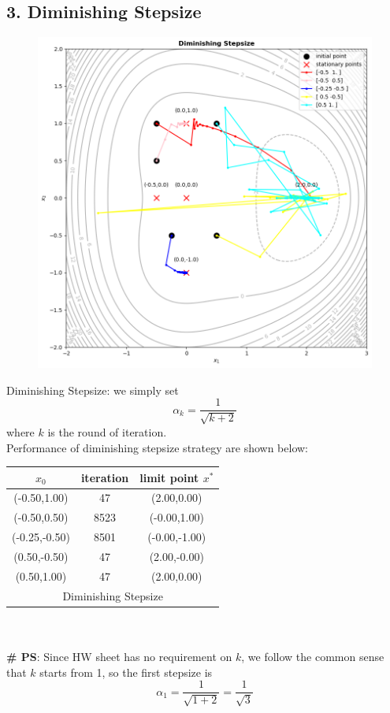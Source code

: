 \documentclass{article}
\newcommand{\subs}[1]{\subsection*{#1}}
\begin{document}
\endgroup
\vspace{1cm}

\subs{3. Diminishing Stepsize}

\begingroup
\setlength{\intextsep}{0pt}%
\setlength{\columnsep}{0pt}%
\begin{figure}%
  \centering
  \includegraphics[width=\linewidth]{Diminishing Stepsize.png}
\end{figure}

\noindent Diminishing Stepsize: we simply set
\[
  \alpha_k = \frac{1}{\sqrt{k+2}}
\]
where $k$ is the round of iteration.\\
Performance of diminishing stepsize strategy are shown below:

\noindent\begin{tabular}{ccc}
    
  \hline
  $x_0$ & iteration & limit point $x^*$\\
  \hline
  (-0.50,1.00) & 47 & (2.00,0.00)  \\ %
  (-0.50,0.50) & 8523 & (-0.00,1.00) \\ %
  (-0.25,-0.50) & 8501 & (-0.00,-1.00)  \\ %
  (0.50,-0.50) & 47 & (2.00,-0.00)  \\ %
  (0.50,1.00) & 47 & (2.00,0.00)  \\ %
        \hline
        \multicolumn{3}{c}{Diminishing Stepsize}\\
        \hline
\end{tabular}\\
\\
\textbf{\# PS}: Since HW sheet has no requirement on $k$, we follow the common sense that $k$ starts from 1, so the first stepsize is
\[
  \alpha_1 = \frac{1}{\sqrt{1+2}} = \frac{1}{\sqrt{3}} 
\]
\end{document}
